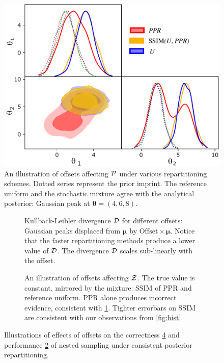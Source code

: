 \documentclass[usenatbib]{mnras}
\begin{document}
\begin{figure}
  \includegraphics[width=0.99\columnwidth]{./illustrations/convergence.pdf}
  \caption{An illustration of offsets affecting ${\cal P}$ under
    various repartitioning schemes. Dotted series represent the prior
    imprint. The reference uniform and the stochastic mixture agree
    with the analytical posterior: Gaussian peak at
    $\bm{\theta} = (4, 6, 8)$. \label{fig:convergence}}
\end{figure}

\begin{figure} \centering
  \begin{subfigure}{0.99\columnwidth}
    \centering

    
    \caption{Kullback-Leibler divergence \({\cal D}\) for different
      offsets: Gaussian peaks displaced from \(\bm{\mu}\) by
      \(\text{Offset}\times \bm{\mu}\). Notice that the faster
      repartitioning methods produce a lower value of \({\cal
        D}\). The divergence \({\cal D}\) scales sub-linearly with the
      offset.\label{fig:kl-d}}
\end{subfigure}

\begin{subfigure}{0.99\columnwidth}
  \centering

  
  
  \caption{An illustration of offsets affecting ${\cal Z}$. The true
    value is constant, mirrored by the mixture: SSIM of PPR and
    reference uniform. PPR alone produces incorrect evidence,
    consistent with \cref{fig:convergence}. Tighter errorbars on SSIM
    are consistent with our observations from
    \cref{fig:hist}.\label{fig:drift}}
\end{subfigure}
\caption{Illustrations of effects of offsets on the correctness
  \ref{fig:drift} and performance \ref{fig:kl-d} of nested sampling
  under consistent posterior repartitioning.}
\end{figure}
\end{document}

